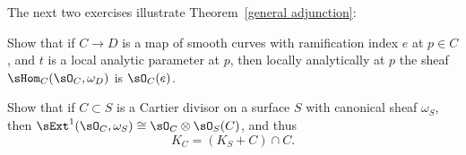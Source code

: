 The next two exercises illustrate Theorem~\ref{general adjunction}:

\begin{exercise}\label{codimension0}
Show that if $C\to D$ is a map of smooth curves with 
ramification index
%
%
$e$ at $p\in C$, and $t$ is a local
analytic parameter at $p$, then
locally analytically at $p$ the sheaf $\sHom_C(\sO_C, \omega_D)$
is $\sO_C(e)$.
\end{exercise}

\begin{exercise}\label{codimension1}
Show that if $C\subset S$ is a
Cartier divisor
%
on a surface $S$ with canonical sheaf $\omega_S$,
then $\sExt^1(\sO_C, \omega_S) \cong \sO_C\otimes \sO_S(C)$, and thus
$$K_C = (K_S+C)\cap C.$$
%
\end{exercise}


